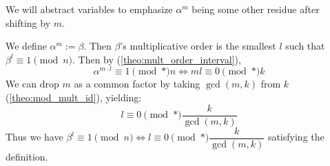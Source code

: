         \newpage 
        \noindent
        We will abstract variables to emphasize $\alpha^m$ being some other residue after shifting by $m$.
        \begin{Proof}
            We define $\alpha^m:=\beta$. Then $\beta$'s multiplicative order is the smallest $l$ such that $\beta^l\equiv 1\pmod{n}$.
            Then by (\ref{theo:mult_order_interval}),
        \[\alpha^{m\cdot l}\equiv 1\pmod*{n}\Longleftrightarrow ml\equiv 0\pmod*{k}\]
        We can drop $m$ as a common factor by taking $\gcd(m,k)$ from $k$ (\ref{theo:mod_mult_id}), yielding:
        \[l\equiv 0\pmod*{\dfrac{k}{\gcd(m,k)}}\]
        \noindent
        Thus we have $\beta^l\equiv 1\pmod{n}\Longleftrightarrow l\equiv 0\pmod*{\dfrac{k}{\gcd(m,k)}}$ satisfying the definition.

        \end{Proof}


    